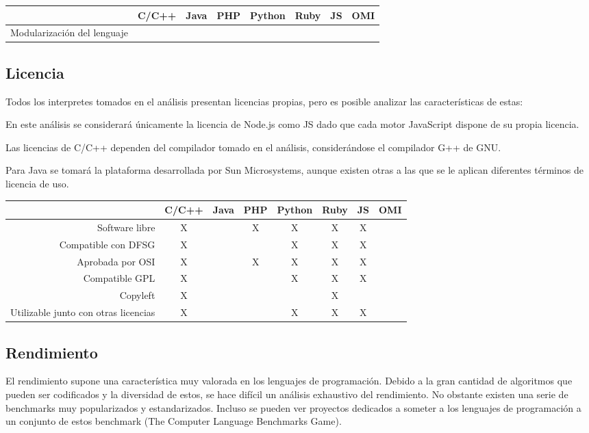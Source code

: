 \FloatBarrier
\begin{table}[h]
\begin{center}
\begin{tabular}{|r|c|c|c|c|c|c|c|} \hline
 & C/C++ & Java & PHP  & Python & Ruby & JS & OMI\\ \hline
Modularización del lenguaje & & &  &  &  &   &  \\ \hline
\end{tabular}
\end{center}
\end{table}
\FloatBarrier


\subsection{Licencia}
Todos los interpretes tomados en el análisis presentan licencias propias, pero es
posible analizar las características de estas:

En este análisis se considerará únicamente la licencia de Node.js como JS
dado que cada motor JavaScript dispone de su propia licencia. 

Las licencias de C/C++ dependen del compilador tomado en el análisis, considerándose el 
compilador G++ de GNU.

Para Java se tomará la plataforma desarrollada por Sun Microsystems, aunque   
existen otras a las que se le aplican diferentes términos de licencia de uso.

\FloatBarrier
\begin{table}[h]
\begin{center}
\begin{tabular}{|r|c|c|c|c|c|c|c|} \hline
 & C/C++ & Java & PHP  & Python & Ruby & JS & OMI\\ \hline
Software libre & X &  & X & X & X & X  &  \\ \hline
Compatible con DFSG & X & &  & X & X & X  &  \\ \hline
Aprobada por OSI & X & & X & X & X &  X &  \\ \hline
Compatible GPL & X & &  & X & X  & X  &   \\ \hline
Copyleft & X & &  & & X &   &  \\ \hline
Utilizable junto con otras licencias & X & &  & X & X &  X &  \\ \hline
\end{tabular}
\end{center}
\end{table}
\FloatBarrier

\subsection{Rendimiento}
El rendimiento supone una característica muy valorada en los lenguajes de programación. 
Debido a la gran cantidad de algoritmos que pueden ser codificados y la diversidad de estos, se hace difícil un análisis exhaustivo del rendimiento.
No obstante existen una serie de benchmarks muy popularizados y estandarizados. Incluso se pueden ver proyectos dedicados a someter 
a los lenguajes de programación a un conjunto de estos benchmark (The Computer Language Benchmarks Game).

